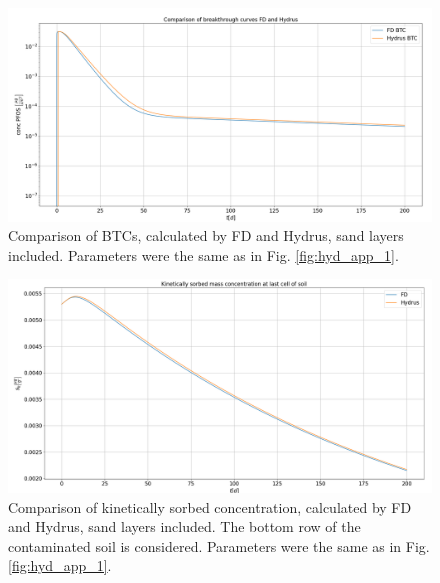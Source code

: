 \FloatBarrier
\begin{figure}
	\centering
	\includegraphics[scale=0.3]{images/hyd_fd_btc_c_sand.png}
\caption[Additional comparison of Hydrus and FD BTCs]{Comparison of BTCs, calculated by FD and Hydrus, sand layers included. Parameters were the same as in Fig. \ref{fig:hyd_app_1}.}
\label{fig:hyd_app_4}
\end{figure}
\begin{figure}
	\centering
	\includegraphics[scale=0.26]{images/hyd_fd_btc_sk_sand.png}
\caption[Additional comparison of Hydrus and FD kinetically sorbed concentrations]{Comparison of kinetically sorbed concentration, calculated by FD and Hydrus, sand layers included. The bottom row of the contaminated soil is considered. Parameters were the same as in Fig. \ref{fig:hyd_app_1}.}
\label{fig:hyd_app_5}
\end{figure}

